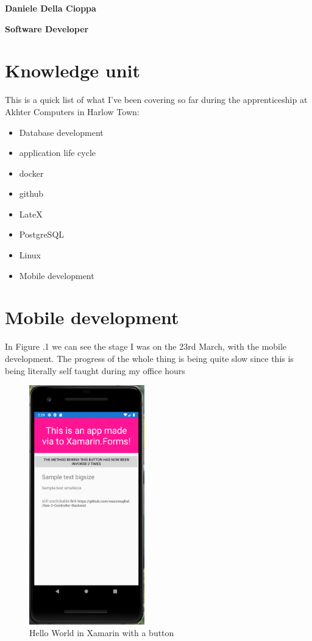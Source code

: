 \documentclass[a4paper,12pt]{article}
\begin{document}
\textbf{Daniele Della Cioppa}

\textbf{Software Developer}

\tableofcontents
\clearpage

\section{Knowledge unit}

This is a quick list of what I've been covering so far during the apprenticeship at Akhter Computers in Harlow Town:

\begin{itemize}
\item {Database development}
\item {application life cycle}
\item docker
\item github 
\item LateX
\item PostgreSQL
\item Linux
\item {Mobile development}
\end{itemize}
\clearpage

\section{Mobile development}

In Figure .1 we can see the stage I was on the 23rd March, with the mobile development. The progress of the whole thing is being quite slow since this is being literally self taught during my office hours

\begin{figure}
\includegraphics[width=5cm]{./capture-app.PNG}
\caption{Hello World in Xamarin with a button\footnotemark{}}\label{wrap-fig:1}
\end{figure} 
\end{document}
